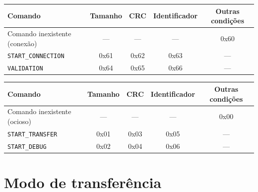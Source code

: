 \begin{quadrofixo}
    \centering
    \small
    \begin{tabular}{|l|c|c|c|c|}
        \hline
        Comando & Tamanho & CRC & Identificador & Outras condições \\
        \hline
        Comando inexistente (conexão) & --- & --- & --- & 0x60 \\
        \hline
        \texttt{START\_CONNECTION} & 0x61 & 0x62 & 0x63 & --- \\
        \hline
        \texttt{VALIDATION} & 0x64 & 0x65 & 0x66 & --- \\
        \hline
    \end{tabular}

    \label{qua:ape-i2-conexao}
\end{quadrofixo}

\begin{quadrofixo}
    \centering
    \small
    \begin{tabular}{|l|c|c|c|c|}
        \hline
        Comando & Tamanho & CRC & Identificador & Outras condições \\
        \hline
        Comando inexistente (ocioso) & --- & --- & --- & 0x00 \\
        \hline
        \texttt{START\_TRANSFER} & 0x01 & 0x03 & 0x05 & --- \\
        \hline
        \texttt{START\_DEBUG} & 0x02 & 0x04 & 0x06 & --- \\
        \hline
    \end{tabular}

    \label{qua:ape-i2-ocioso}
\end{quadrofixo}

\section{Modo de transferência}
\label{sec:ape-i2-transferencia}

